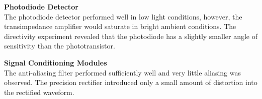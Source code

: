 \textbf{Photodiode Detector}\\
The photodiode detector performed well in low light conditions, however, the transimpedance amplifier would saturate in bright ambient conditions. The directivity experiment revealed that the photodiode has a slightly smaller angle of sensitivity than the phototransistor.

\textbf{Signal Conditioning Modules}\\
The anti-aliasing filter performed sufficiently well and very little aliasing was observed. The precision rectifier introduced only a small amount of distortion into the rectified waveform.















